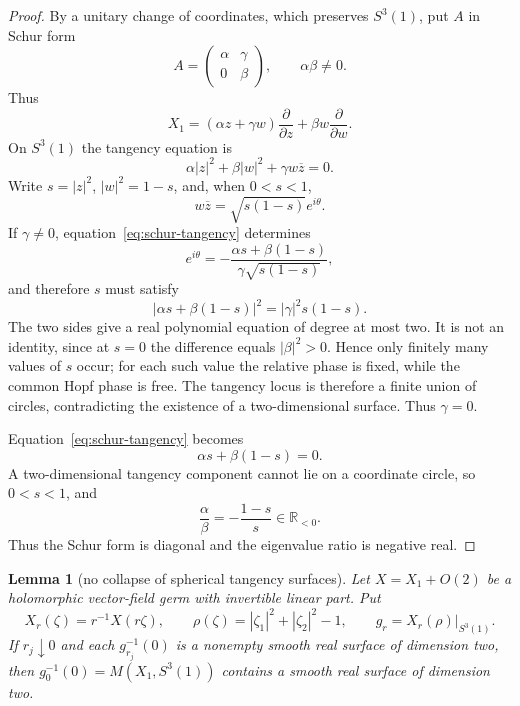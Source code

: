 \documentclass[11pt,reqno]{article}
\newtheorem{lemma}[theorem]{Lemma}
\theoremstyle{remark}
\newcommand{\R}{\mathbb R}
\newcommand{\pd}{\partial}
\newcommand{\ol}{\overline}
\begin{document}
\begin{proof}
By a unitary change of coordinates, which preserves $S^3(1)$, put $A$ in Schur form
\[
 A=\begin{pmatrix}\alpha&\gamma\\0&\beta\end{pmatrix},
 \qquad \alpha\beta\ne0.
\]
Thus
\[
 X_1=(\alpha z+\gamma w)\frac{\pd}{\pd z}
      +\beta w\frac{\pd}{\pd w}.
\]
On $S^3(1)$ the tangency equation is
\begin{equation}\label{eq:schur-tangency}
 \alpha|z|^2+\beta|w|^2+\gamma w\ol z=0.
\end{equation}
Write $s=|z|^2$, $|w|^2=1-s$, and, when $0<s<1$,
\[
 w\ol z=\sqrt{s(1-s)}e^{i\theta}.
\]
If $\gamma\ne0$, equation~\eqref{eq:schur-tangency} determines
\[
 e^{i\theta}=-\frac{\alpha s+\beta(1-s)}{\gamma\sqrt{s(1-s)}},
\]
and therefore $s$ must satisfy
\begin{equation}\label{eq:schur-modulus}
 |\alpha s+\beta(1-s)|^2=|\gamma|^2s(1-s).
\end{equation}
The two sides give a real polynomial equation of degree at most two. It is not an identity, since at $s=0$ the difference equals $|\beta|^2>0$. Hence only finitely many values of $s$ occur; for each such value the relative phase is fixed, while the common Hopf phase is free. The tangency locus is therefore a finite union of circles, contradicting the existence of a two-dimensional surface. Thus $\gamma=0$.

Equation~\eqref{eq:schur-tangency} becomes
\[
 \alpha s+\beta(1-s)=0.
\]
A two-dimensional tangency component cannot lie on a coordinate circle, so $0<s<1$, and
\[
 \frac{\alpha}{\beta}=-\frac{1-s}{s}\in\R_{<0}.
\]
Thus the Schur form is diagonal and the eigenvalue ratio is negative real.
\end{proof}

\begin{lemma}[no collapse of spherical tangency surfaces]\label{lem:no-collapse}
Let $X=X_1+O(2)$ be a holomorphic vector-field germ with invertible linear part. Put
\[
 X_r(\zeta)=r^{-1}X(r\zeta),\qquad
 \rho(\zeta)=|\zeta_1|^2+|\zeta_2|^2-1,
 \qquad g_r=X_r(\rho)|_{S^3(1)}.
\]
If $r_j\downarrow0$ and each $g_{r_j}^{-1}(0)$ is a nonempty smooth real surface of dimension two, then $g_0^{-1}(0)=M(X_1,S^3(1))$ contains a smooth real surface of dimension two.
\end{lemma}
\end{document}
